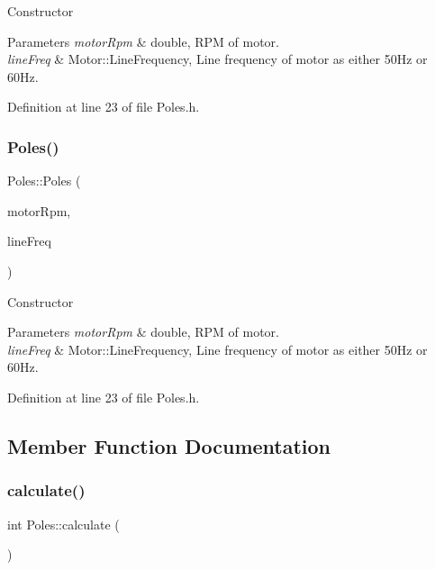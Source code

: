 Constructor 
\begin{DoxyParams}{Parameters}
{\em motor\+Rpm} & double, R\+PM of motor. \\
\hline
{\em line\+Freq} & Motor\+::\+Line\+Frequency, Line frequency of motor as either 50\+Hz or 60\+Hz. \\
\hline
\end{DoxyParams}


Definition at line 23 of file Poles.\+h.

\mbox{\label{class_poles_aade5d01dab7a461e582449e5bb17f6d6}} 
\subsubsection{\texorpdfstring{Poles()}{Poles()}\hspace{0.1cm}{\footnotesize\ttfamily [3/3]}}
{\footnotesize\ttfamily Poles\+::\+Poles (\begin{DoxyParamCaption}\item[{double}]{motor\+Rpm,  }\item[{Motor\+::\+Line\+Frequency}]{line\+Freq }\end{DoxyParamCaption})\hspace{0.3cm}{\ttfamily [inline]}}

Constructor 
\begin{DoxyParams}{Parameters}
{\em motor\+Rpm} & double, R\+PM of motor. \\
\hline
{\em line\+Freq} & Motor\+::\+Line\+Frequency, Line frequency of motor as either 50\+Hz or 60\+Hz. \\
\hline
\end{DoxyParams}


Definition at line 23 of file Poles.\+h.



\subsection{Member Function Documentation}
\mbox{\label{class_poles_a23988f68100374c8277dca81ab06f724}} 
\subsubsection{\texorpdfstring{calculate()}{calculate()}\hspace{0.1cm}{\footnotesize\ttfamily [1/3]}}
{\footnotesize\ttfamily int Poles\+::calculate (\begin{DoxyParamCaption}{ }\end{DoxyParamCaption})}

